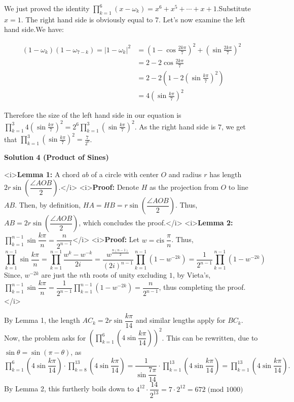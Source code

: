 \begin{enumerate}
 We just proved the identity $\prod_{k=1}^6 (x - \omega_k) = x^6+x^5+\cdots+x+1$.Substitute $x=1$. The right hand side is obviously equal to $7$. Let's now examine the left hand side.We have:

 
 \begin{align*} (1-\omega_k)(1-\omega_{7-k})=|1-\omega_k|^2  & = \left( 1-\cos \frac{2k\pi}7 \right)^2 + \left( \sin \frac{2k\pi}7 \right)^2 \\ & = 2-2\cos \frac{2k\pi}7 \\ & = 2-2 \left( 1 - 2 \left( \sin \frac{k\pi}7 \right)^2 \right) \\ & = 4\left( \sin \frac{k\pi}7 \right)^2 \end{align*}


 Therefore the size of the left hand side in our equation is $\prod_{k=1}^3 4 (\sin \frac{k\pi}7)^2 = 2^6 \prod_{k=1}^3 (\sin \frac{k\pi}7)^2$. As the right hand side is $7$, we get that $\prod_{k=1}^3 (\sin \frac{k\pi}7)^2 = \frac{7}{2^6}$.

 



\textbf{Solution 4 (Product of Sines)}

<i>\textbf{Lemma 1:} A chord $ab$ of a circle with center $O$ and radius $r$ has length $2r\sin\left(\dfrac{\angle AOB}{2}\right)$.</i>
<i>\textbf{Proof:} Denote $H$ as the projection from $O$ to line $AB$. Then, by definition, $HA=HB=r\sin\left(\dfrac{\angle AOB}{2}\right)$. Thus, $AB = 2r\sin\left(\dfrac{\angle AOB}{2}\right)$, which concludes the proof.</i>
<i>\textbf{Lemma 2:} $\prod_{k=1}^{n-1} \sin \dfrac{k\pi}{n} = \dfrac{n}{2^{n-1}}$</i>
<i>\textbf{Proof:} Let $w=\text{cis}\;\dfrac{\pi}{n}$. Thus,
 \[\prod_{k=1}^{n-1} \sin \dfrac{k\pi}{n} = \prod_{k=1}^{n-1} \dfrac{w^k-w^{-k}}{2i} = \dfrac{w^{\frac{n(n-1)}{2}}}{(2i)^{n-1}}\prod_{k=1}^{n-1} (1-w^{-2k}) = \dfrac{1}{2^{n-1}}\prod_{k=1}^{n-1} (1-w^{-2k})\]Since, $w^{-2k}$ are just the $n$th roots of unity excluding $1$, by Vieta's, $\prod_{k=1}^{n-1} \sin \dfrac{k\pi}{n}=\dfrac{1}{2^{n-1}}\prod_{k=1}^{n-1} (1-w^{-2k}) = \dfrac{n}{2^{n-1}}$, thus completing the proof.</i>

 By Lemma 1, the length $AC_k=2r\sin\dfrac{k\pi}{14}$ and similar lengths apply for $BC_k$. Now, the problem asks for $\left(\prod_{k=1}^6 \left(4\sin\dfrac{k\pi}{14}\right)\right)^2$. This can be rewritten, due to $\sin \theta = \sin (\pi-\theta)$, as $\prod_{k=1}^6 \left(4\sin\dfrac{k\pi}{14}\right) \cdot \prod_{k=8}^{13} \left(4\sin\dfrac{k\pi}{14}\right) = \dfrac{1}{\sin \dfrac{7\pi}{14}}\cdot \prod_{k=1}^{13} \left(4\sin\dfrac{k\pi}{14}\right) = \prod_{k=1}^{13} \left(4\sin\dfrac{k\pi}{14}\right).$ By Lemma 2, this furtherly boils down to $4^{12}\cdot \dfrac{14}{2^{13}} = 7\cdot 2^{12} = \boxed{672} \; \text{(mod }1000\text{)}$




\end{enumerate}
